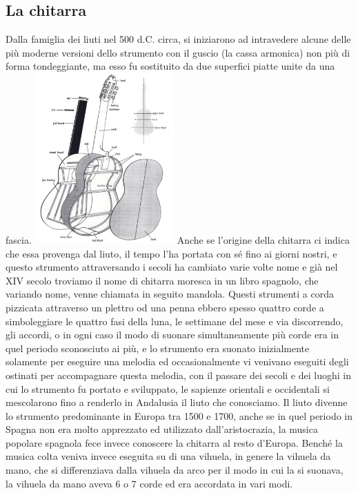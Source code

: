 \documentclass[oneside]{article}
\begin{document}
\begin{multicols*}{2}

\section{ La chitarra}

Dalla famiglia dei liuti nel 500 d.C. circa, si iniziarono ad intravedere alcune delle più moderne versioni dello strumento con il guscio (la cassa armonica) non più di forma tondeggiante, ma esso fu sostituito da due superfici piatte unite da una fascia.
\includegraphics[width=0.4\textwidth]{img/chit_spaccato.png}
Anche se l’origine della chitarra ci indica che essa provenga dal liuto, il tempo l’ha portata con sé fino ai giorni nostri, e questo strumento attraversando i secoli ha cambiato varie volte nome e già nel XIV secolo troviamo il nome di chitarra moresca in un libro spagnolo, che variando nome, venne chiamata in seguito mandola.
Questi strumenti a corda pizzicata attraverso un plettro od una penna ebbero spesso quattro corde a simboleggiare le quattro fasi della luna, le settimane del mese e via discorrendo, gli accordi, o in ogni caso il modo di suonare simultaneamente più corde era in quel periodo sconosciuto ai più, e lo strumento era suonato inizialmente solamente per eseguire una melodia ed occasionalmente vi venivano eseguiti degli ostinati per accompagnare questa melodia, con il passare dei secoli e dei luoghi in cui lo strumento fu portato e sviluppato, le sapienze orientali e occidentali si mescolarono fino a renderlo in Andalusia il liuto che conosciamo.
Il liuto divenne lo strumento predominante in Europa tra 1500 e 1700, anche se in quel periodo in Spagna non era molto apprezzato ed utilizzato dall’aristocrazia, la musica popolare spagnola fece invece conoscere la chitarra al resto d’Europa. Benché la musica colta veniva invece eseguita su di una vihuela, in genere la vihuela da mano, che si differenziava dalla vihuela da arco per il modo in cui la si suonava, la vihuela da mano aveva 6 o 7 corde ed era accordata in vari modi.

\end{multicols*}
\end{document}
